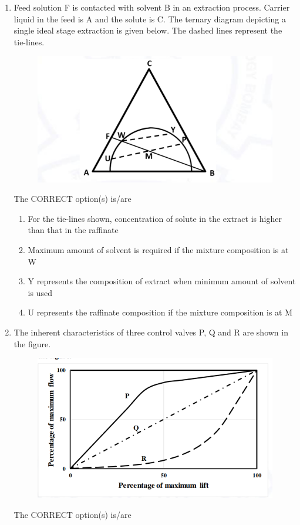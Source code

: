 \documentclass[journal,12pt,onecolumn]{IEEEtran}
\theoremstyle{remark}
\begin{document}
\begin{enumerate}
\item Feed solution F is contacted with solvent B in an extraction process. Carrier liquid in the feed is A and the solute is C. The ternary diagram depicting a single ideal stage extraction is given below. The dashed lines represent the tie-lines.
\begin{figure}[H]
	\includegraphics[width = 0.8\columnwidth]{q17.png}
	\caption*{}
	\label{fig:q17}
\end{figure}
 The CORRECT option(s) is/are

\hfill{}

\begin{enumerate}
\item For the tie-lines shown, concentration of solute in the extract is higher than that in the raffinate
\item Maximum amount of solvent is required if the mixture composition is at W
\item Y represents the composition of extract when minimum amount of solvent is used
\item U represents the raffinate composition if the mixture composition is at M
\end{enumerate}

\item The inherent characteristics of three control valves P, Q and R are shown in the figure. 
\begin{figure}[H]
	\includegraphics[width = 0.8\columnwidth]{q18.png}
	\caption*{}
	\label{fig:q28}
\end{figure}
The CORRECT option(s) is/are


\end{enumerate}
\end{document}
